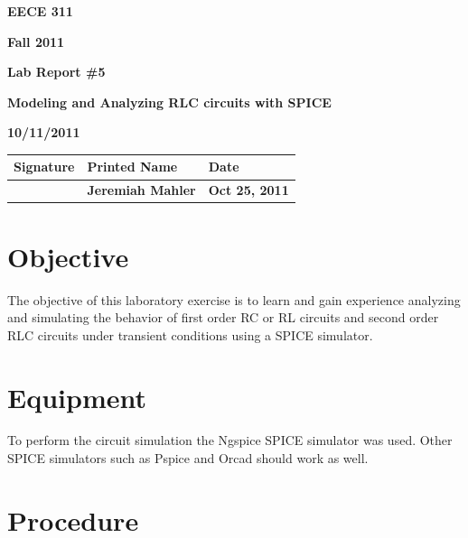 \documentclass{article}
\begin{document}

\null
\thispagestyle{empty}
\vspace{0.5in}
\centerline{\bf EECE 311}
\centerline{\bf Fall 2011}
\centerline{\bf}
\centerline{\bf Lab Report \#5}
\centerline{\bf Modeling and Analyzing RLC circuits with SPICE}
\centerline{\bf 10/11/2011}  %

\vspace{0.5in}
\begin{center}
\begin{tabularx}{\textwidth}[b]{X l l}
Signature & Printed Name & Date \\
\hline
\multicolumn{1}{|X|}{} & \multicolumn{1}{|l|}{\bigstrut \bf Jeremiah Mahler} & \multicolumn{1}{|l|}{\bf Oct 25, 2011} \\
\hline
\end{tabularx}
\end{center}


\vfill
\pagebreak

\tableofcontents

\pagebreak

\section{Objective}

The objective of this laboratory exercise is to learn and gain
experience analyzing and simulating the behavior of first
order RC or RL circuits and second order RLC circuits under transient
conditions using a SPICE simulator.


\section{Equipment}

To perform the circuit simulation the Ngspice\cite{NGSPICE} SPICE\cite{wiki:SPICE} simulator was used.
Other SPICE simulators such as Pspice\cite{wiki:Pspice} and Orcad\cite{ORCAD}
should work as well.


\section{Procedure}
\end{document}
